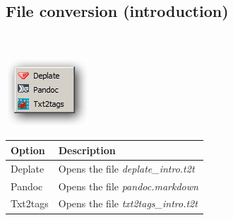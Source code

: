\hypertarget{menu_help_main_fileconversion}{}
\subsection{File conversion (introduction)}\\

\includegraphics[scale=0.50]{./res/menu_help_conversion.png}\\

\begin{scriptsize}\begin{tabularx}{\textwidth}{>{\hsize=0.3\hsize}X>{\hsize=0.7\hsize}X}\\
    \hline
    \textbf{Option} & \textbf{Description} \\
    \hline
    Deplate & Opens the file \textit{deplate\_intro.t2t} \\
    Pandoc & Opens the file \textit{pandoc.markdown} \\
    Txt2tags & Opens the file \textit{txt2tags\_intro.t2t} \\
    \hline
  \end{tabularx}\end{scriptsize}
